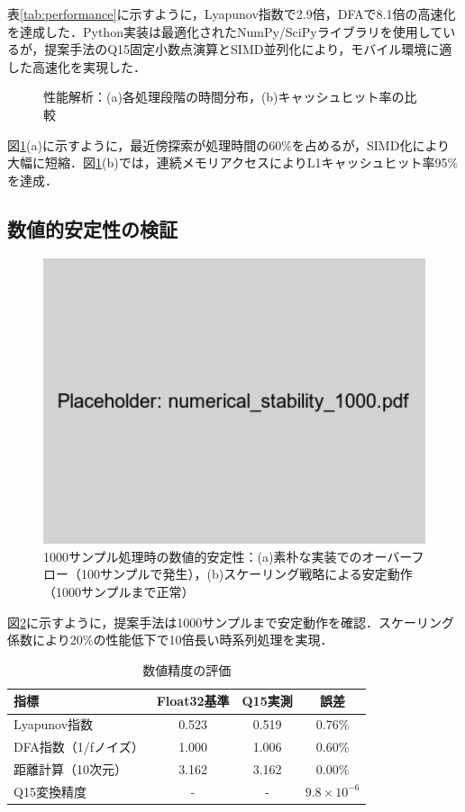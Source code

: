 \documentclass[paper]{ieice}
\begin{document}
表\ref{tab:performance}に示すように，Lyapunov指数で2.9倍，DFAで8.1倍の高速化を達成した．Python実装は最適化されたNumPy/SciPyライブラリを使用しているが，提案手法のQ15固定小数点演算とSIMD並列化により，モバイル環境に適した高速化を実現した．

\begin{figure}[t]
\centering
{}
\caption{性能解析：(a)各処理段階の時間分布，(b)キャッシュヒット率の比較}
\label{fig:performance_analysis}
\end{figure}

図\ref{fig:performance_analysis}(a)に示すように，最近傍探索が処理時間の60\%を占めるが，SIMD化により大幅に短縮．図\ref{fig:performance_analysis}(b)では，連続メモリアクセスによりL1キャッシュヒット率95\%を達成．

\subsection{数値的安定性の検証}

\begin{figure}[t]
\centering
\includegraphics[width=0.85\linewidth]{numerical_stability_1000.pdf}
\caption{1000サンプル処理時の数値的安定性：(a)素朴な実装でのオーバーフロー（100サンプルで発生），(b)スケーリング戦略による安定動作（1000サンプルまで正常）}
\label{fig:stability}
\end{figure}

図\ref{fig:stability}に示すように，提案手法は1000サンプルまで安定動作を確認．スケーリング係数により20\%の性能低下で10倍長い時系列処理を実現．

\begin{table}[t]
\caption{数値精度の評価}
\label{tab:accuracy}
\centering
\begin{tabular}{lccc}
\toprule
指標 & Float32基準 & Q15実測 & 誤差 \\
\midrule
Lyapunov指数 & 0.523 & 0.519 & 0.76\% \\
DFA指数（1/fノイズ） & 1.000 & 1.006 & 0.60\% \\
距離計算（10次元） & 3.162 & 3.162 & 0.00\% \\
Q15変換精度 & - & - & $9.8 \times 10^{-6}$ \\
\bottomrule
\end{tabular}
\end{table}
\end{document}

